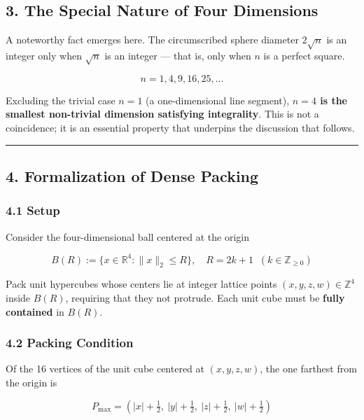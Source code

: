 \documentclass[a4paper,11pt]{article}
\theoremstyle{definition}
\begin{document}
\subsection{3. The Special Nature of Four
Dimensions}\label{the-special-nature-of-four-dimensions}

A noteworthy fact emerges here. The circumscribed sphere diameter
\(2\sqrt{n}\) is an integer only when \(\sqrt{n}\) is an integer ---
that is, only when \(n\) is a perfect square.

\[n = 1, 4, 9, 16, 25, \ldots\]

Excluding the trivial case \(n = 1\) (a one-dimensional line segment),
\textbf{\(n = 4\) is the smallest non-trivial dimension satisfying
integrality}. This is not a coincidence; it is an essential property
that underpins the discussion that follows.

\begin{center}\rule{0.5\linewidth}{0.5pt}\end{center}

\subsection{4. Formalization of Dense
Packing}\label{formalization-of-dense-packing}

\subsubsection{4.1 Setup}\label{setup}

Consider the four-dimensional ball centered at the origin

\[B(R) := \{x \in \mathbb{R}^4 : \|x\|_2 \le R\}, \quad R = 2k+1 \;\; (k \in \mathbb{Z}_{\ge 0})\]

Pack unit hypercubes whose centers lie at integer lattice points
\((x, y, z, w) \in \mathbb{Z}^4\) inside \(B(R)\), requiring that they
not protrude. Each unit cube must be \textbf{fully contained} in
\(B(R)\).

\subsubsection{4.2 Packing Condition}\label{packing-condition}

Of the 16 vertices of the unit cube centered at \((x, y, z, w)\), the
one farthest from the origin is

\[P_{\max} = \left(|x|+\tfrac{1}{2},\ |y|+\tfrac{1}{2},\ |z|+\tfrac{1}{2},\ |w|+\tfrac{1}{2}\right)\]
\end{document}
